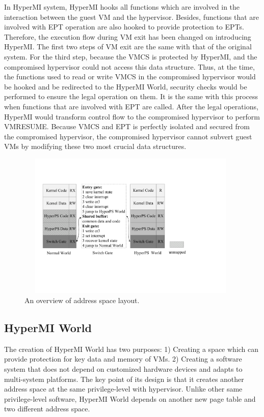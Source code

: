 \documentclass[conference]{IEEEtran}
\begin{document}
In HyperMI system, HyperMI hooks all functions which are involved in the interaction between the guest VM and the hypervisor. Besides, functions that are involved with EPT operation are also hooked to provide protection to EPTs. Therefore, the execution flow during VM exit has been changed on introducing HyperMI. The first two steps of VM exit are the same with that of the original system. For the third step, because the VMCS is protected by HyperMI, and the compromised hypervisor could not access this data structure. Thus, at the time, the functions used to read or write VMCS in the compromised hypervisor would be hooked and be redirected to the HyperMI World, security checks would be performed to ensure the legal operation on them. It is the same with this process when functions that are involved with EPT are called. 
After the legal operations, HyperMI would transform control flow to the compromised hypervisor to perform VMRESUME. Because VMCS and EPT is perfectly isolated and secured from the compromised hypervisor, the compromised hypervisor cannot subvert guest VMs by modifying these two most crucial data structures.

\fi





\begin{figure}
\centerline{\includegraphics[width=11cm, height=7cm]{pdfvmcs2.pdf}}%
\caption{An overview of address space layout.} \label{fig2}
\end{figure}



\subsection{HyperMI World} \label {HWorld}

The creation of HyperMI World has two purposes: 1) Creating a space which can provide protection for key data and memory of VMs. 2) Creating a software system that does not depend on customized hardware devices and adapts to multi-system platforms. The key point of its design is that it creates another address space at the same privilege-level with hypervisor. Unlike other same privilege-level software, HyperMI World depends on another new page table and two different address space.
\end{document}
